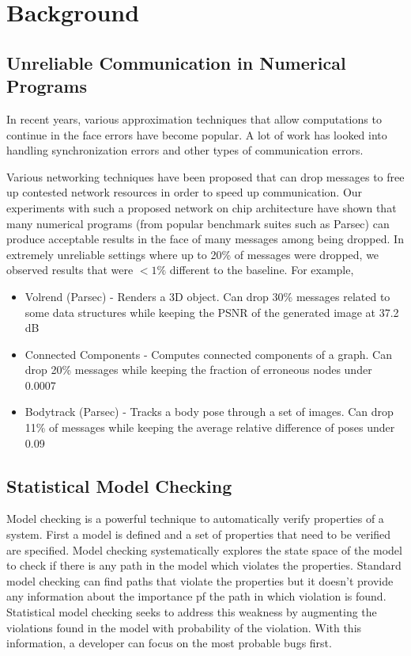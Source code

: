 \section{Background}
\subsection{Unreliable Communication in Numerical Programs}
In recent years, various approximation techniques that allow
computations to continue in the face errors have become popular.
A lot of work has looked into handling synchronization errors and
other types of communication errors. 

Various networking techniques have been proposed that can drop
messages to free up contested network resources in order to speed up
communication. Our experiments with such a proposed network on chip
architecture have shown that many numerical programs (from popular
benchmark suites such as Parsec) can produce acceptable results in the
face of many messages among being dropped. In extremely unreliable
settings where up to 20\% of messages were dropped, we observed results
that were $<1\%$ different to the baseline.
For example, 
\begin{itemize}
  \item Volrend (Parsec) - Renders a 3D object.
Can drop 30\% messages related to some data structures while keeping
the PSNR of the generated image at 37.2 dB
\item Connected Components - Computes connected components of a graph.
Can drop 20\% messages while keeping the fraction of erroneous nodes under 0.0007
\item Bodytrack (Parsec) - Tracks a body pose through a set of images.
Can drop 11\% of messages while keeping the average relative difference
of poses under 0.09
\end{itemize}


\subsection{Statistical Model Checking}
Model checking is a powerful technique to automatically verify properties of a system. First a model is defined and a set of properties that need to be verified are specified. Model checking systematically explores the state space of the model to check if there is any path in the model which violates the properties. Standard model checking can find paths that violate the properties but it doesn't provide any information about the importance pf the path in which violation is found. Statistical model checking seeks to address this weakness by augmenting the violations found in the model with probability of the violation. With this information, a developer can focus on the most probable bugs first.

